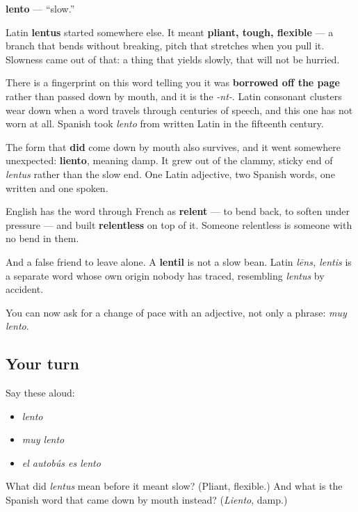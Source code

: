 \begin{cousinweb}
\textbf{lento} — \textquotedblleft{}slow.\textquotedblright{}

Latin \textbf{lentus} started somewhere else. It meant \textbf{pliant, tough, flexible} — a branch that bends without breaking, pitch that stretches when you pull it. Slowness came out of that: a thing that yields slowly, that will not be hurried.

There is a fingerprint on this word telling you it was \textbf{borrowed off the page} rather than passed down by mouth, and it is the \emph{-nt-}. Latin consonant clusters wear down when a word travels through centuries of speech, and this one has not worn at all. Spanish took \emph{lento} from written Latin in the fifteenth century.

The form that \textbf{did} come down by mouth also survives, and it went somewhere unexpected: \textbf{liento}, meaning damp. It grew out of the clammy, sticky end of \emph{lentus} rather than the slow end. One Latin adjective, two Spanish words, one written and one spoken.

English has the word through French as \textbf{relent} — to bend back, to soften under pressure — and built \textbf{relentless} on top of it. Someone relentless is someone with no bend in them.

And a false friend to leave alone. A \textbf{lentil} is not a slow bean. Latin \emph{lēns, lentis} is a separate word whose own origin nobody has traced, resembling \emph{lentus} by accident.
\end{cousinweb}

\begin{grammarlens}[title={What you've built}]
You can now ask for a change of pace with an adjective, not only a phrase: \emph{muy lento}.
\end{grammarlens}

\subsection*{Your turn}
Say these aloud:

\begin{itemize}
\raggedright
  \item \emph{lento}
  \item \emph{muy lento}
  \item \emph{el autobús es lento}
\end{itemize}

\begin{tcolorbox}[breakable,colback=teal!4,colframe=teal!35!black,title={Before you move on}]
What did \emph{lentus} mean before it meant slow? (Pliant, flexible.) And what is the Spanish word that came down by mouth instead? (\emph{Liento}, damp.)
\end{tcolorbox}
